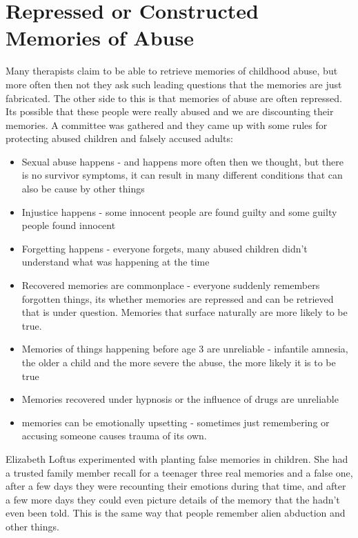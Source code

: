 \documentclass[12pt]{article}
\begin{document}
\section*{Repressed or Constructed Memories of Abuse}
Many therapists claim to be able to retrieve memories of childhood abuse, but more often then not they ask such leading questions that the memories are just fabricated. The other side to this is that memories of abuse are often repressed. Its possible that these people were really abused and we are discounting their memories. A committee was gathered and they came up with some rules for protecting abused children and falsely accused adults:
\begin{itemize}
\item Sexual abuse happens - and happens more often then we thought, but there is no survivor symptoms, it can result in many different conditions that can also be cause by other things
\item Injustice happens - some innocent people are found guilty and some guilty people found innocent
\item Forgetting happens - everyone forgets, many abused children didn’t understand what was happening at the time
\item Recovered memories are commonplace - everyone suddenly remembers forgotten things, its whether memories are repressed and can be retrieved that is under question. Memories that surface naturally are more likely to be true.
\item Memories of things happening before age 3 are unreliable - infantile amnesia, the older a child and the more severe the abuse, the more likely it is to be true
\item Memories recovered under hypnosis or the influence of drugs are unreliable
\item memories can be emotionally upsetting - sometimes just remembering or accusing someone causes trauma of its own.
\end{itemize} 
Elizabeth Loftus experimented with planting false memories in children. She had a trusted family member recall for a teenager three real memories and a false one, after a few days they were recounting their emotions during that time, and after a few more days they could even picture details of the memory that the hadn’t even been told. This is the same way that people remember alien abduction and other things. 
\end{document}
